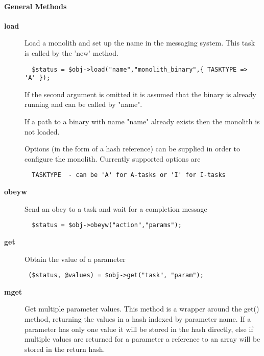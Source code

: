 \paragraph*{General Methods\label{ORAC::Msg::Task::ADAM_General_Methods}}
\begin{description}

\item[{\textbf{load}}] \mbox{}

Load a monolith and set up the name in the messaging system.
This task is called by the 'new' method.

\begin{verbatim}
  $status = $obj->load("name","monolith_binary",{ TASKTYPE => 'A' });
\end{verbatim}


If the second argument is omitted it is assumed that the binary
is already running and can be called by "name".



If a path to a binary with name "name" already exists then the monolith
is not loaded.



Options (in the form of a hash reference) can be supplied
in order to configure the monolith. Currently supported options
are

\begin{verbatim}
  TASKTYPE  - can be 'A' for A-tasks or 'I' for I-tasks
\end{verbatim}

\item[{\textbf{obeyw}}] \mbox{}

Send an obey to a task and wait for a completion message

\begin{verbatim}
  $status = $obj->obeyw("action","params");
\end{verbatim}

\item[{\textbf{get}}] \mbox{}

Obtain the value of a parameter

\begin{verbatim}
 ($status, @values) = $obj->get("task", "param");
\end{verbatim}

\item[{\textbf{mget}}] \mbox{}

Get multiple parameter values. This method is a wrapper around
the get() method, returning the values in a hash indexed
by parameter name. If a parameter has only one value it will
be stored in the hash directly, else if multiple values are
returned for a parameter a reference to an array will be stored
in the return hash.


\end{description}
